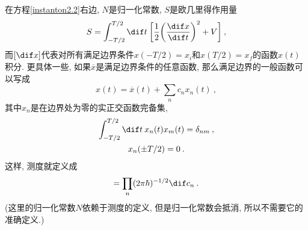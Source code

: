 在方程\eqref{instanton2.2}右边, $N$是归一化常数, $S$是欧几里得作用量
\begin{equation}
    S=\int_{-T/2}^{T/2} \dif t\:\biggl[\frac{1}{2}\biggl(\frac{\dif x}{\dif t}\biggr)^{2}+V\biggr] \:, \label{instanton2.5}
\end{equation}
而$[\dif x]$代表对所有满足边界条件$x(-T/2)=x_{i}$和$x(T/2)=x_{f}$的函数$x(t)$积分. 更具体一些, 如果$\overline{x}$是满足边界条件的任意函数, 那么满足边界的一般函数可以写成
\begin{equation}
    x(t)=\overline{x}(t)+\sum_{n}c_{n}x_{n}(t) \:, \label{instanton2.6}
\end{equation}
其中$x_{n}$是在边界处为零的实正交函数完备集,
\begin{subequations}\label{instanton2.7}
    \begin{gather}
        \int_{-T/2}^{T/2} \dif t\: x_{n}(t)x_{m}(t) = \delta_{nm} \:, \label{instanton2.7a} \\
        x_{n}(\pm T/2)=0 \:.  \label{instanton2.7b}
    \end{gather}
\end{subequations}
这样, 测度就定义成
\begin{equation}
    [\dif x] = \prod_{n} (2\pi\hbar)^{-1/2} \dif c_{n} \:. \label{instanton2.8}
\end{equation}
(这里的归一化常数$N$依赖于测度的定义, 但是归一化常数会抵消, 所以不需要它的准确定义.)

